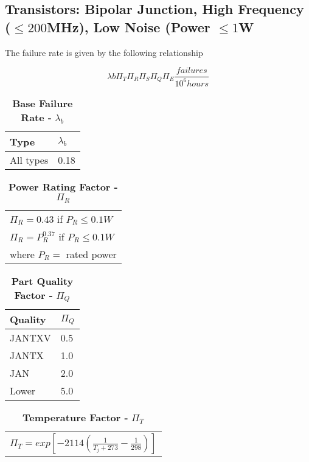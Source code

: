 \subsection{Transistors: Bipolar Junction, High Frequency ($\leq 200$MHz), Low Noise (Power $\leq 1$W}
\label{subsection:transistors-bipolar-junction-high-frequency-200mhz-low-noise-power-1w}

The failure rate is given by the following relationship

$$\lambda{b} \Pi_{T} \Pi_{R} \Pi_{S} \Pi_{Q} \Pi_{E} \frac{failures}{10^{6} hours}$$



\begin{table}
\caption{\textbf{Base Failure Rate -} $\lambda_{b}$}
\label{table:baseFaileRateBjtHigh}
\begin{tabular}{|l|m{10cm}|} \hline
\textbf{Type} & $\lambda_{b}$ \\ \hline
All types & 0.18 \\ \hline
\end{tabular}
\end{table}

\begin{table}
\caption{\textbf{Power Rating Factor -} $\Pi_{R}$}
\label{table:powerRateFactorBjtHigh}
\begin{tabular}{l} \hline
$\Pi_{R} = 0.43$ if $P_{R} \leq 0.1W$ \\
$\Pi_{R} = P^{0.37}_{R}$ if $P_{R} \leq 0.1W$ \\
where $P_{R} = $ rated power
\end{tabular}
\end{table}

\begin{table}
\caption{\textbf{Part Quality Factor -} $\Pi_{Q}$}
\label{table:baseFaileRateBjtHigh}
\begin{tabular}{|l|m{10cm}|} \hline
\textbf{Quality} & $\Pi_{Q}$ \\ \hline
JANTXV & 0.5 \\ \hline
JANTX & 1.0 \\ \hline
JAN & 2.0 \\ \hline
Lower & 5.0 \\ \hline
\end{tabular}
\end{table}


\begin{table}
\caption{\textbf{Temperature Factor -} $\Pi_{T}$}
\label{table:tempFactorBjtHigh}
\begin{tabular}{l} \hline
$\Pi_{T} = exp[-2114(\frac{1}{T_j + 273} - \frac{1}{298})]$
\end{tabular}
\end{table}


